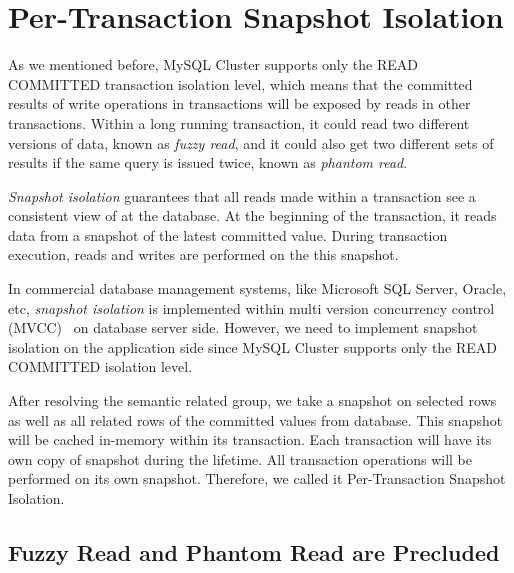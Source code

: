 \section{Per-Transaction Snapshot Isolation}

As we mentioned before, MySQL Cluster supports only the READ COMMITTED transaction isolation level, which means that the committed results of write operations in transactions will be exposed by reads in other transactions. Within a long running transaction, it could read two different versions of data, known as \textit{fuzzy read}, and it could also get two different sets of results if the same query is issued twice, known as \textit{phantom read}.

\noindent \textit{Snapshot isolation} guarantees that all reads made within a transaction see a consistent view of at the database. At the beginning of the transaction, it reads data from a snapshot of the latest committed value. During transaction execution, reads and writes are performed on the this snapshot.

\noindent In commercial database management systems, like Microsoft SQL Server, Oracle, etc, \textit{snapshot isolation} is implemented within multi version concurrency control (MVCC)~\cite{berenson1995critique} on database server side. However, we need to implement snapshot isolation on the application side since MySQL Cluster supports only the READ COMMITTED isolation level.

\noindent After resolving the semantic related group, we take a snapshot on selected rows as well as all related rows of the committed values from database. This snapshot will be cached in-memory within its transaction. Each transaction will have its own copy of snapshot during the lifetime. All transaction operations will be performed on its own snapshot. Therefore, we called it Per-Transaction Snapshot Isolation.

\subsection{Fuzzy Read and Phantom Read are Precluded}

